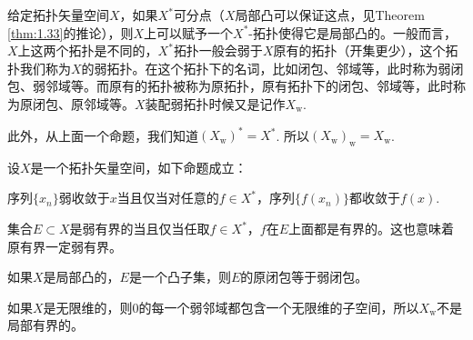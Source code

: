 \begin{para}[拓扑矢量空间的弱拓扑]
给定拓扑矢量空间$X$，如果$X^*$可分点（$X$局部凸可以保证这点，见Theorem \ref{thm:1.33}的推论），则$X$上可以赋予一个$X^*$-拓扑使得它是局部凸的。一般而言，$X$上这两个拓扑是不同的，$X^*$拓扑一般会弱于$X$原有的拓扑（开集更少），这个拓扑我们称为$X$的弱拓扑。在这个拓扑下的名词，比如闭包、邻域等，此时称为弱闭包、弱邻域等。而原有的拓扑被称为原拓扑，原有拓扑下的闭包、邻域等，此时称为原闭包、原邻域等。$X$装配弱拓扑时候又是记作$X_{\text{w}}$.

此外，从上面一个命题，我们知道$(X_{\text{w}})^*=X^*$. 所以$(X_{\text{w}})_{\text{w}}=X_{\text{w}}$. 
\end{para}

\begin{pro}设$X$是一个拓扑矢量空间，如下命题成立：
\begin{compactenum}[~~~(1)]
\item 序列$\{x_n\}$弱收敛于$x$当且仅当对任意的$f\in X^*$，序列$\{f(x_n)\}$都收敛于$f(x)$.
\item 集合$E\subset X$是弱有界的当且仅当任取$f\in X^*$，$f$在$E$上面都是有界的。这也意味着原有界一定弱有界。
\item 如果$X$是局部凸的，$E$是一个凸子集，则$E$的原闭包等于弱闭包。
\item 如果$X$是无限维的，则$0$的每一个弱邻域都包含一个无限维的子空间，所以$X_{\mathrm{w}}$不是局部有界的。
\end{compactenum}
\end{pro}

